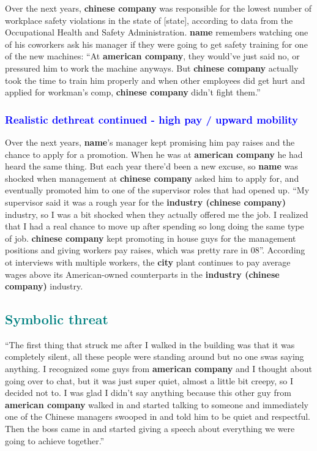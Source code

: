 \documentclass[12pt]{article}
\begin{document}
Over the next years, \textbf{chinese company} was responsible for the lowest number of workplace safety violations in the state of [state], according to data from the Occupational Health and Safety Administration. \textbf{name} remembers watching one of his coworkers ask his manager if they were going to get safety training for one of the new machines: ``At \textbf{american company}, they would've just said no, or pressured him to work the machine anyways. But \textbf{chinese company} actually took the time to train him properly and when other employees did get hurt and applied for workman's comp, \textbf{chinese company} didn't fight them.''

\subsubsection{\textcolor{blue}{Realistic dethreat continued - high pay / upward mobility}}

Over the next years, \textbf{name}'s manager kept promising him pay raises and the chance to apply for a promotion. When he was at \textbf{american company} he had heard the same thing. But each year there'd been a new excuse, so \textbf{name} was shocked when management at \textbf{chinese company} asked him to apply for, and eventually promoted him to one of the supervisor roles that had opened up. ``My supervisor said it was a rough year for the \textbf{industry (chinese company)} industry, so I was a bit shocked when they actually offered me the job. I realized that I had a real chance to move up after spending so long doing the same type of job. \textbf{chinese company} kept promoting in house guys for the management positions and giving workers pay raises, which was pretty rare in 08''. According ot interviews with multiple workers, the \textbf{city} plant continues to pay average wages above its American-owned counterparts in the \textbf{industry (chinese company)} industry.

\subsection{\textcolor{teal}{Symbolic threat}}

``The first thing that struck me after I walked in the building was that it was completely silent, all these people were standing around but no one swas saying anything. I recognized some guys from \textbf{american company} and I thought about going over to chat, but it was just super quiet, almost a little bit creepy, so I decided not to. I was glad I didn't say anything because this other guy from \textbf{american company} walked in and started talking to someone and immediately one of the Chinese managers swooped in and told him to be quiet and respectful. Then the boss came in and started giving a speech about everything we were going to achieve together.''
\end{document}
